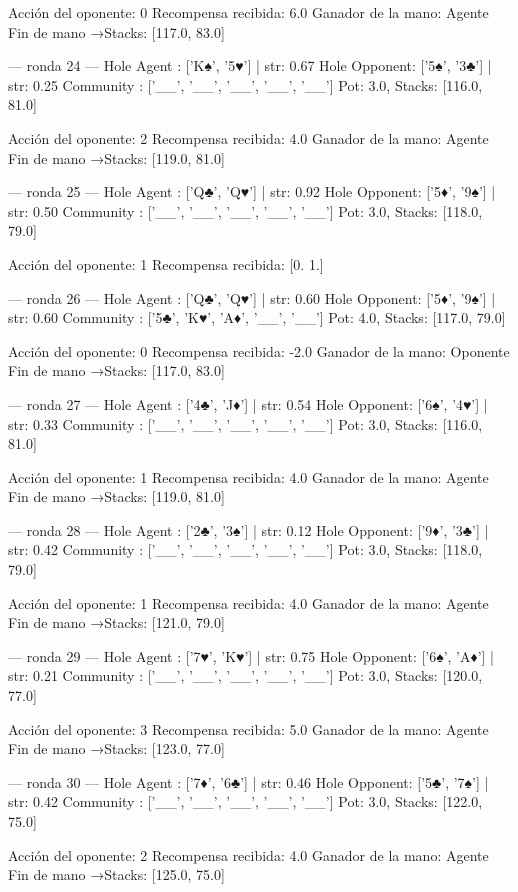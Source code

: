Acción del oponente: 0
Recompensa recibida: 6.0
Ganador de la mano: Agente
Fin de mano →Stacks: [117.0, 83.0]


--- ronda 24 ---
Hole Agent : ['K♠', '5♥'] | str: 0.67
Hole Opponent: ['5♠', '3♣'] | str: 0.25
Community  : ['__', '__', '__', '__', '__']
Pot: 3.0, Stacks: [116.0, 81.0]

Acción del oponente: 2
Recompensa recibida: 4.0
Ganador de la mano: Agente
Fin de mano →Stacks: [119.0, 81.0]


--- ronda 25 ---
Hole Agent : ['Q♣', 'Q♥'] | str: 0.92
Hole Opponent: ['5♦', '9♠'] | str: 0.50
Community  : ['__', '__', '__', '__', '__']
Pot: 3.0, Stacks: [118.0, 79.0]

Acción del oponente: 1
Recompensa recibida: [0. 1.]

--- ronda 26 ---
Hole Agent : ['Q♣', 'Q♥'] | str: 0.60
Hole Opponent: ['5♦', '9♠'] | str: 0.60
Community  : ['5♣', 'K♥', 'A♦', '__', '__']
Pot: 4.0, Stacks: [117.0, 79.0]

Acción del oponente: 0
Recompensa recibida: -2.0
Ganador de la mano: Oponente
Fin de mano →Stacks: [117.0, 83.0]


--- ronda 27 ---
Hole Agent : ['4♣', 'J♦'] | str: 0.54
Hole Opponent: ['6♠', '4♥'] | str: 0.33
Community  : ['__', '__', '__', '__', '__']
Pot: 3.0, Stacks: [116.0, 81.0]

Acción del oponente: 1
Recompensa recibida: 4.0
Ganador de la mano: Agente
Fin de mano →Stacks: [119.0, 81.0]


--- ronda 28 ---
Hole Agent : ['2♣', '3♠'] | str: 0.12
Hole Opponent: ['9♦', '3♣'] | str: 0.42
Community  : ['__', '__', '__', '__', '__']
Pot: 3.0, Stacks: [118.0, 79.0]

Acción del oponente: 1
Recompensa recibida: 4.0
Ganador de la mano: Agente
Fin de mano →Stacks: [121.0, 79.0]


--- ronda 29 ---
Hole Agent : ['7♥', 'K♥'] | str: 0.75
Hole Opponent: ['6♠', 'A♦'] | str: 0.21
Community  : ['__', '__', '__', '__', '__']
Pot: 3.0, Stacks: [120.0, 77.0]

Acción del oponente: 3
Recompensa recibida: 5.0
Ganador de la mano: Agente
Fin de mano →Stacks: [123.0, 77.0]


--- ronda 30 ---
Hole Agent : ['7♦', '6♣'] | str: 0.46
Hole Opponent: ['5♣', '7♠'] | str: 0.42
Community  : ['__', '__', '__', '__', '__']
Pot: 3.0, Stacks: [122.0, 75.0]

Acción del oponente: 2
Recompensa recibida: 4.0
Ganador de la mano: Agente
Fin de mano →Stacks: [125.0, 75.0]


